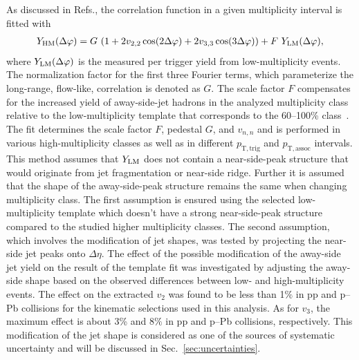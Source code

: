 As discussed in Refs.\cite{ATLAS:2015hzw,ATLAS:2016yzd}, the correlation function in a given multiplicity interval is fitted with 
\begin{eqnarray}
\label{eq:narray}
Y_{\rm{HM}}(\Delta\varphi) = G~(1 + 2v_{2,2}\cos(2\Delta\varphi) + 2v_{3,3}\cos(3\Delta\varphi)) + F~Y_{\rm{LM}}(\Delta\varphi),
\label{eq:tmpfit}
\end{eqnarray}
where $Y_{\rm{LM}}(\Delta\varphi)$ is the measured per trigger yield from low-multiplicity events. The normalization factor for the first three Fourier terms, which parameterize the long-range, flow-like, correlation is denoted as $G$. The scale factor $F$ compensates for the increased yield of away-side-jet hadrons in the analyzed multiplicity class relative to the low-multiplicity template that corresponds to the 60--100\% class~\cite{ALICE:2013tla,ALICE:2014mas}.
The fit determines the scale factor $F$, pedestal $G$, and $v_{n,n}$ and is performed in various high-multiplicity classes as well as in different $p_\mathrm{T,trig}$ and $p_\mathrm{T,assoc}$ intervals. 
This method assumes that $Y_{\rm{LM}}$ does not contain a near-side-peak structure that would originate from jet fragmentation or near-side ridge.
Further it is assumed that the shape of the away-side-peak structure remains the same when changing multiplicity class.
The first assumption is ensured using the selected low-multiplicity template which doesn't have a strong near-side-peak structure compared to the studied higher multiplicity classes. The second assumption, which involves the modification of jet shapes, was tested by projecting the near-side jet peaks onto $\Delta\eta$. 
The effect of the possible modification of the away-side jet yield on the result of the template fit was investigated by adjusting the away-side shape based on the observed differences between low- and high-multiplicity events. The effect on the extracted $v_2$ was found to be less than 1$\%$ in pp and p--Pb collisions for the kinematic selections used in this analysis. As for $v_3$, the maximum effect is about 3\% and 8$\%$ in pp and p--Pb collisions, respectively.  This modification of the jet shape is considered as one of the sources of systematic uncertainty and will be discussed in Sec.~\ref{sec:uncertainties}.

